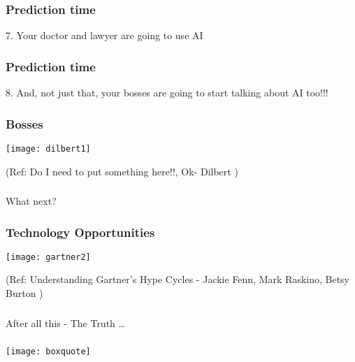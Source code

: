 \begin{frame}[fragile]\frametitle{Prediction time}
7. Your doctor and lawyer are going to use AI
\end{frame}

\begin{frame}[fragile]\frametitle{Prediction time}
8. And, not just that, your bosses are going to start talking about AI too!!!
\end{frame}

\begin{frame}[fragile]\frametitle{Bosses}
\begin{center}
\texttt{[image: dilbert1]}
\end{center}
{\tiny (Ref: Do I need to put something here!!, Ok- Dilbert )}
\end{frame}

\begin{frame}[fragile]\frametitle{}
\begin{center}
{\Large What next?}
\end{center}
\end{frame}

\begin{frame}[fragile]\frametitle{Technology Opportunities}
\begin{center}
\texttt{[image: gartner2]}
\end{center}
{\tiny (Ref: Understanding Gartner's Hype Cycles - Jackie Fenn, Mark Raskino, Betsy Burton )}
\end{frame}


\begin{frame}[fragile]\frametitle{}
\begin{center}
{\Large After all this - The Truth \ldots}
\end{center}
\end{frame}

\begin{frame}[fragile]\frametitle{}
\begin{center}
\texttt{[image: boxquote]}
\end{center}
\end{frame}



